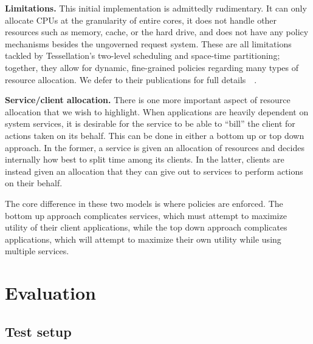 \documentclass[letterpaper,twocolumn,11pt]{article}
\begin{document}
\textbf{Limitations.} This initial implementation is admittedly rudimentary. It can only allocate CPUs at the granularity of entire cores, it does not handle other resources such as memory, cache, or the hard drive, and does not have any policy mechanisms besides the ungoverned request system. These are all limitations tackled by Tessellation's two-level scheduling and space-time partitioning; together, they allow for dynamic, fine-grained policies regarding many types of resource allocation. We defer to their publications for full details~\cite{liu09tessellation}~\cite{tessellation-hotpar10}.

\textbf{Service/client allocation.} There is one more important aspect of resource allocation that we wish to highlight. When applications are heavily dependent on system services, it is desirable for the service to be able to ``bill'' the client for actions taken on its behalf. This can be done in either a bottom up or top down approach. In the former, a service is given an allocation of resources and decides internally how best to split time among its clients. In the latter, clients are instead given an allocation that they can give out to services to perform actions on their behalf.

The core difference in these two models is where policies are enforced. The bottom up approach complicates services, which must attempt to maximize utility of their client applications, while the top down approach complicates applications, which will attempt to maximize their own utility while using multiple services.

\section{Evaluation}

\subsection{Test setup}
\end{document}
